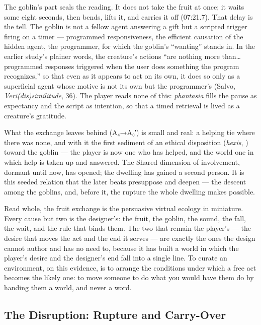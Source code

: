 The goblin's part seals the reading. It does not take the fruit at once; it waits some eight seconds, then bends, lifts it, and carries it off (07:21.7). That delay is the tell. The goblin is not a fellow agent answering a gift but a scripted trigger firing on a timer — programmed responsiveness, the efficient causation of the hidden agent, the programmer, for which the goblin's ``wanting'' stands in. In the earlier study's plainer words, the creature's actions ``are nothing more than… programmed responses triggered when the user does something the program recognizes,'' so that even as it appears to act on its own, it does so only as a superficial agent whose motive is not its own but the programmer's (Salvo, \textit{Veri(dis)similitude}, 36). The player reads none of this: \textit{phantasia} fills the pause as expectancy and the script as intention, so that a timed retrieval is lived as a creature's gratitude.

What the exchange leaves behind (A₄→A₀′) is small and real: a helping tie where there was none, and with it the first sediment of an ethical disposition (\textit{hexis}, ) toward the goblin — the player is now one who has helped, and the world one in which help is taken up and answered. The Shared dimension of involvement, dormant until now, has opened; the dwelling has gained a second person. It is this seeded relation that the later beats presuppose and deepen — the descent among the goblins, and, before it, the rupture the whole dwelling makes possible.

Read whole, the fruit exchange is the persuasive virtual ecology in miniature. Every cause but two is the designer's: the fruit, the goblin, the sound, the fall, the wait, and the rule that binds them. The two that remain the player's — the desire that moves the act and the end it serves — are exactly the ones the design cannot author and has no need to, because it has built a world in which the player's desire and the designer's end fall into a single line. To curate an environment, on this evidence, is to arrange the conditions under which a free act becomes the likely one: to move someone to do what you would have them do by handing them a world, and never a word.

\bigskip

\subsection*{The Disruption: Rupture and Carry-Over}

